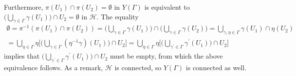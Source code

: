 \documentclass[10pt,leqno]{article}
\begin{document}
Furthermore, $\pi(U_1)\cap \pi(U_2)=\emptyset$ in $Y(\varGamma)$ is equivalent to $\big(\bigcup_{\gamma\in \varGamma}\gamma(U_1)\big)\cap U_2 = \emptyset$ in $\mathcal H$. The equality
\begin{multline}\label{eq: disjoint nbds in modular curve}
    \emptyset = \pi^{-1}(\pi(U_1)\cap \pi(U_2)) = \Bigg(\bigcup_{\gamma\in \varGamma}\gamma(U_1)\Bigg)\cap \Bigg(\bigcup_{\gamma\in \varGamma}\gamma(U_2)\Bigg) = \bigcup_{\gamma,\eta\in \varGamma}\gamma(U_1)\cap \eta(U_2)\\ = \bigcup_{\eta\in \varGamma}\eta\Bigg[\Bigg(\bigcup_{\gamma\in \varGamma}(\eta^{-1}\gamma)(U_1)\Bigg)\cap U_2\Bigg] = \bigcup_{\eta\in \varGamma}\eta\Bigg[\Bigg(\bigcup_{\gamma^\prime\in \varGamma}\gamma^\prime(U_1)\Bigg)\cap U_2\Bigg]
\end{multline}
implies that $\big(\bigcup_{\gamma^\prime\in \varGamma}\gamma^\prime(U_1)\big)\cap U_2$ must be empty, from which the above equivalence follows.
As a remark, $\mathcal H$ is connected, so $Y(\varGamma)$ is connected as well.
\end{document}
